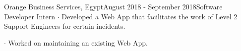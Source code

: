 \vspace{3mm}

\begin{verbose}{Orange Business Services, Egypt}{August 2018 - September 2018}{Software Developer Intern}
    \noindent $\cdot$ Developed a Web App that facilitates the work of Level 2 Support Engineers for certain incidents.

    \noindent $\cdot$ Worked on maintaining an existing Web App.
\end{verbose}

